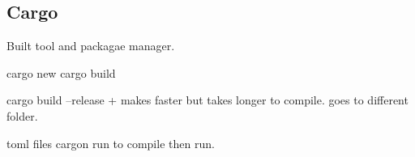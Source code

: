 
\subsection{Cargo}

Built tool and packagae manager.

cargo new
cargo build

cargo build --release
+ makes faster but takes longer to compile. goes to different folder.

toml files
cargon run to compile then run.
